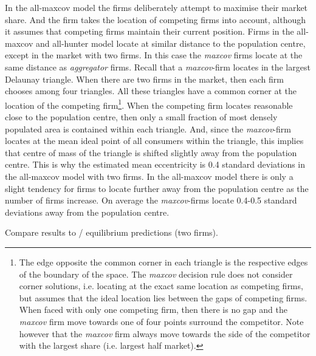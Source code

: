 \documentclass[preprint, 12pt]{elsarticle}
\newcommand*{\TODO}{\textbf{\fbox{??}}}%
\begin{document}
In the all-maxcov model the firms deliberately attempt to maximise their market share. And the firm takes the location of competing firms into account, although it assumes that competing firms maintain their current position. Firms in the all-maxcov and all-hunter model locate at similar distance to the population centre, except in the market with two firms. In this case the \emph{maxcov} firms locate at the same distance as \emph{aggregator} firms. Recall that a \emph{maxcov}-firm locates in the largest Delaunay triangle. When there are two firms in the market, then each firm chooses among four triangles. All these triangles have a common corner at the location of the competing firm\footnote{The edge opposite the common corner in each triangle is the respective edges of the boundary of the space. The \emph{maxcov} decision rule does not consider corner solutions, i.e. locating at the exact same location as competing firms, but assumes that the ideal location lies between the gaps of competing firms. When faced with only one competing firm, then there is no gap and the \emph{maxcov} firm move towards one of four points surround the competitor. Note however that the \emph{maxcov} firm always move towards the side of the competitor with the largest share (i.e. largest half market).}. When the competing firm locates reasonable close to the population centre, then only a small fraction of most densely populated area is contained within each triangle. And, since the \emph{maxcov}-firm locates at the mean ideal point of all consumers within the triangle, this implies that centre of mass of the triangle is shifted slightly away from the population centre. This is why the estimated mean eccentricity is 0.4 standard deviations in the all-maxcov model with two firms. In the all-maxcov model there is only a slight tendency for firms to locate further away from the population centre as the number of firms increase. On average the \emph{maxcov}-firms locate 0.4-0.5 standard deviations away from the population centre.

\TODO{Compare results to \citet{Eaton_Lipsey_1975} / equilibrium predictions (two firms).}
\end{document}

